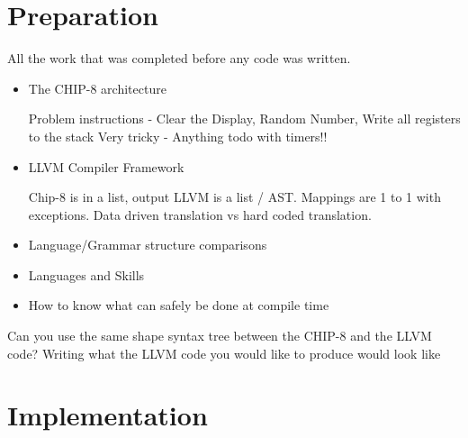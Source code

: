 \documentclass[12pt,a4paper,twoside]{article}
\begin{document}
\section{Preparation}
    All the work that was completed before any code was written.
\begin{itemize}
\item The CHIP-8 architecture

Problem instructions - Clear the Display, Random Number, Write all registers to the stack
Very tricky - Anything todo with timers!!
\item LLVM Compiler Framework

Chip-8 is in a list, output LLVM is a list / AST. Mappings are 1 to 1 with exceptions. Data driven translation vs hard coded translation.

\item Language/Grammar structure comparisons
\item Languages and Skills
\item How to know what can safely be done at compile time
\end{itemize}
Can you use the same shape syntax tree between the CHIP-8 and the LLVM code?
Writing what the LLVM code you would like to produce would look like 
\section{Implementation}
\end{document}
